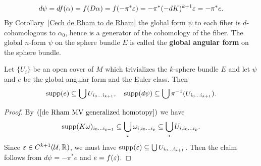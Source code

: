 \begin{align*}
d\psi=df(\alpha)=f(D\alpha)=f(-\pi^*\varepsilon)=-\pi^*(-dK)^{k+1}\varepsilon=-\pi^*e.
\end{align*}
By Corollary~\ref{Cech de Rham to de Rham} the global form $\psi$ to each fiber is $d$-cohomologous to $\alpha_0$, hence is a generator of the cohomology of the fiber. 
The global $n$-form $\psi$ on the sphere bundle $E$ is called the \textbf{global angular form} on the sphere bundle.
\begin{proposition}\label{sphere bundle Euler class supp}
Let $\{U_i\}$ be an open cover of $M$ which trivializes the $k$-sphere bundle $E$ and let $\psi$ and $e$ be the global angular form and the Euler class. Then
\[\mathrm{supp}(e)\subseteq\bigcup U_{i_0\dots i_{k+1}},\quad \mathrm{supp}(d\psi)\subseteq\bigcup\pi^{-1}(U_{i_0\dots i_{k+1}}).\]
\end{proposition}
\begin{proof}
By $(\ref{de Rham MV generalized homotopy})$ we have
\[\mathrm{supp}(K\omega)_{i_0\dots i_{p-1}}\subseteq\bigcup_i\omega_{i,i_0\dots i_p}\subseteq\bigcup_{i}U_{i,i_0\dots i_p}.\]
Since $\varepsilon\in C^{k+1}(\mathcal{U},\mathbb{R})$, we must have $\mathrm{supp}(\varepsilon)\subseteq\bigcup U_{i_0\dots i_{k+1}}$. Then the claim follows from $d\psi=-\pi^*e$ and $e=f(\varepsilon)$.
\end{proof}
